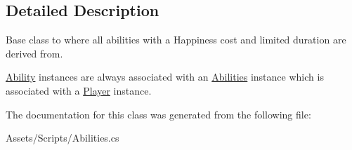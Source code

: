 \subsection{Detailed Description}
Base class to where all abilities with a Happiness cost and limited duration are derived from. 

\hyperlink{class_assets_1_1_scripts_1_1_ability}{Ability} instances are always associated with an \hyperlink{class_assets_1_1_scripts_1_1_abilities}{Abilities} instance which is associated with a \hyperlink{class_assets_1_1_scripts_1_1_player}{Player} instance. 

The documentation for this class was generated from the following file\+:\begin{DoxyCompactItemize}
\item 
Assets/\+Scripts/Abilities.\+cs\end{DoxyCompactItemize}
